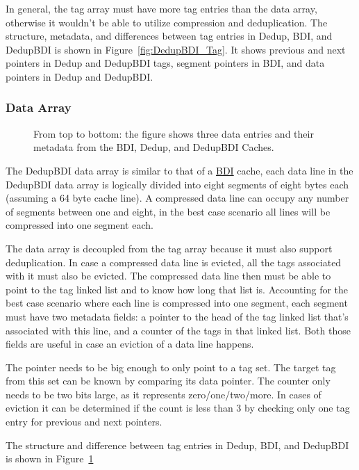 In general, the tag array must have more tag entries than the data array, otherwise it wouldn't be able to utilize compression and deduplication. The structure, metadata, and differences between tag entries in Dedup, BDI, and DedupBDI is shown in Figure~\ref{fig:DedupBDI_Tag}. It shows previous and next pointers in Dedup and DedupBDI tags, segment pointers in BDI, and data pointers in Dedup and DedupBDI.
\subsubsection{Data Array}
\label{sssec:DedupBDIData}
\begin{figure}
    \caption[DedupBDI Data Array]{From top to bottom: the figure shows three data entries and their metadata from the BDI, Dedup, and DedupBDI Caches.}
    \label{fig:DedupBDI_Data}
\end{figure}
The DedupBDI data array is similar to that of a \hyperref[sssec:BDIData]{BDI} cache, each data line in the DedupBDI data array is logically divided into eight segments of eight bytes each (assuming a 64 byte cache line). A compressed data line can occupy any number of segments between one and eight, in the best case scenario all lines will be compressed into one segment each.\par
The data array is decoupled from the tag array because it must also support deduplication. In case a compressed data line is evicted, all the tags associated with it must also be evicted. The compressed data line then must be able to point to the tag linked list and to know how long that list is. Accounting for the best case scenario where each line is compressed into one segment, each segment must have two metadata fields: a pointer to the head of the tag linked list that's associated with this line, and a counter of the tags in that linked list. Both those fields are useful in case an eviction of a data line happens.\par
The pointer needs to be big enough to only point to a tag set. The target tag from this set can be known by comparing its data pointer. The counter only needs to be two bits large, as it represents zero/one/two/more. In cases of eviction it can be determined if the count is less than 3 by checking only one tag entry for previous and next pointers.\par
The structure and difference between tag entries in Dedup, BDI, and DedupBDI is shown in Figure~\ref{fig:DedupBDI_Data}

